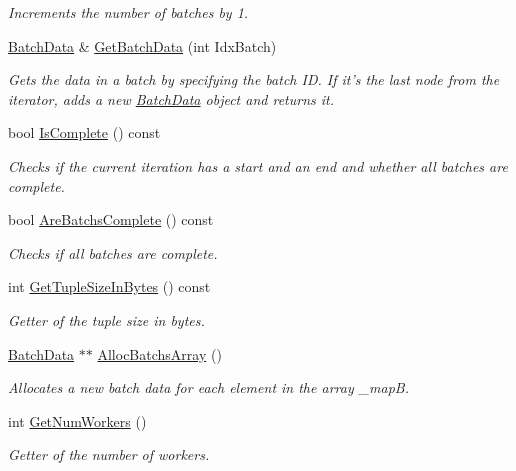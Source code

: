\begin{DoxyCompactItemize}
\begin{DoxyCompactList}\small\item\em Increments the number of batches by 1. \end{DoxyCompactList}\item 
\hyperlink{class_batch_data}{Batch\-Data} \& \hyperlink{class_iter_data_ac437f6f1b288d95d07a341420985d560}{Get\-Batch\-Data} (int Idx\-Batch)
\begin{DoxyCompactList}\small\item\em Gets the data in a batch by specifying the batch I\-D. If it's the last node from the iterator, adds a new \hyperlink{class_batch_data}{Batch\-Data} object and returns it. \end{DoxyCompactList}\item 
bool \hyperlink{class_iter_data_af2ae93caf86c95f45c505846a698b9e2}{Is\-Complete} () const 
\begin{DoxyCompactList}\small\item\em Checks if the current iteration has a start and an end and whether all batches are complete. \end{DoxyCompactList}\item 
bool \hyperlink{class_iter_data_a26f9b64165ba90f882aa7ca4e0896cc3}{Are\-Batchs\-Complete} () const 
\begin{DoxyCompactList}\small\item\em Checks if all batches are complete. \end{DoxyCompactList}\item 
int \hyperlink{class_iter_data_a41a194699551536e6a32b9558edee861}{Get\-Tuple\-Size\-In\-Bytes} () const 
\begin{DoxyCompactList}\small\item\em Getter of the tuple size in bytes. \end{DoxyCompactList}\item 
\hyperlink{class_batch_data}{Batch\-Data} $\ast$$\ast$ \hyperlink{class_iter_data_a027f9296d3a93d9e5b15abc08519acfc}{Alloc\-Batchs\-Array} ()
\begin{DoxyCompactList}\small\item\em Allocates a new batch data for each element in the array \-\_\-map\-B. \end{DoxyCompactList}\item 
int \hyperlink{class_iter_data_a77586ae939bcca9bbbedf71bc692da89}{Get\-Num\-Workers} ()
\begin{DoxyCompactList}\small\item\em Getter of the number of workers. \end{DoxyCompactList}\item 
$$
\end{DoxyCompactItemize}
